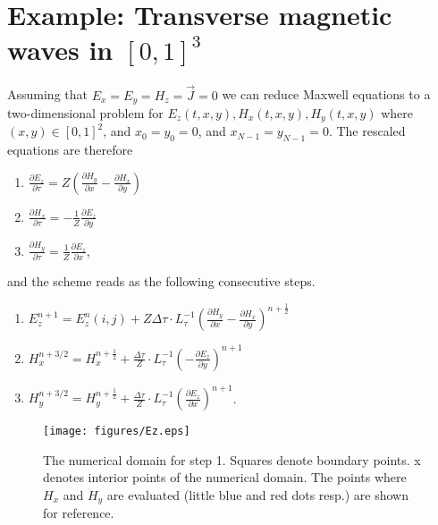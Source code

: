 \documentclass[12pt,reqno]{amsart}
\theoremstyle{definition}
\numberwithin{equation}{section}
\begin{document}
	
	
	
	\section{Example: Transverse magnetic waves  in $[0,1]^3$}\label{sec:TE}
	Assuming that $E_x=E_y=H_z=\vec{J}=0$ we can reduce Maxwell equations to a two-dimensional problem for $E_z(t,x,y), H_x(t,x,y), H_y(t,x,y)$ where  $(x,y)\in[0,1]^2$, and
	$x_0=y_0=0$, and $x_{N-1}=y_{N-1}=0$.
	The rescaled equations are therefore 
	
	\begin{enumerate}
		\item  $ \frac{\partial E_z}{\partial \tau }=Z\left (
		\frac{\partial H_y}{\partial x}-\frac{\partial H_x}{\partial y}
		\right)$
		\item 	  $ \frac{\partial H_x}{\partial \tau }=-\frac{1}{Z}\frac{\partial E_z}{\partial y}$
		\item 	  $ \frac{\partial H_y}{\partial \tau }=\frac{1}{Z}\frac{\partial E_z}{\partial x}$,
		
	\end{enumerate}
	and the scheme  reads as the following consecutive steps.
	\begin{enumerate}
		\item  $ E_z^{n+1}=E_z^n(i,j)+Z\Delta \tau \cdot L^{-1}_{\tau}\left (\frac{\partial H_y}{\partial x}-
		\frac{\partial H_x}{\partial y}
		\right)^{n+\frac{1}{2}}$\\[1mm]
		\item $ H_x^{n+3/2}=H_x^{n+\frac{1}{2}}+\frac{\Delta \tau}{Z} \cdot  L^{-1}_{\tau}\left (-
		\frac{\partial E_z}{\partial y}
		\right)^{n+1} $\\[1mm]
		\item $ H_y^{n+3/2}=H_y^{n+\frac{1}{2}}+\frac{\Delta \tau}{Z} \cdot  L_{\tau}^{-1}\left (
		\frac{\partial E_z}{\partial x}
		\right)^{n+1} $.
	\end{enumerate}
	\begin{figure}[!t]
		\centering
		\texttt{[image: figures/Ez.eps]}
		\caption{
			The numerical domain for step 1.
			Squares denote boundary points. x denotes interior points of the numerical domain.  The points where $H_x$ and $H_y$ are evaluated (little blue and red dots resp.) are shown for reference.}
		\label{fig:E}
		
	\end{figure}
	
\end{document}
